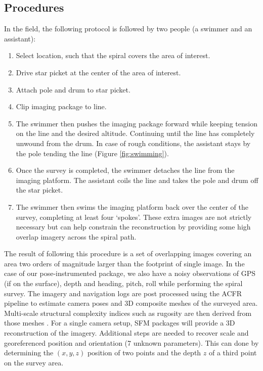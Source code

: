 \subsection{Procedures}

In the field, the following protocol is followed by two people (a swimmer and an assistant):\begin{enumerate}
\item Select location, such that the spiral covers the area of interest.
\item Drive star picket at the center of the area of interest. 
\item Attach pole and drum to star picket.
\item Clip imaging package to line.
\item The swimmer then pushes the imaging package forward while keeping tension on the line and the desired altitude. Continuing until the line has completely unwound from the drum. In case of rough conditions, the assistant stays by the pole tending the line (Figure \ref{fig:swimming}).
\item Once the survey is completed, the swimmer detaches the line from the imaging platform. The assistant coils the line and takes the pole and drum off the star picket. 
\item The swimmer then swims the imaging platform back over the center of the survey, completing at least four `spokes'. These extra images are not strictly necessary but can help constrain the reconstruction by providing some high overlap imagery across the spiral path.
\end{enumerate}

The result of following this procedure is a set of overlapping images covering an area two orders of magnitude larger than the footprint of single image. In the case of our pose-instrumented package, we also have a noisy observations of GPS (if on the surface), depth and heading, pitch, roll while performing the spiral survey. The imagery and navigation logs are post processed using the ACFR pipeline \cite{Johnson_Roberson_2010} \cite{Mahon_2008} \cite{Johnson_Roberson_2013} to estimate camera poses and 3D composite meshes of the surveyed area. Multi-scale structural complexity indices such as rugosity are then derived from those meshes \cite{Friedman_2012}.
For a single camera setup, SFM packages will provide a 3D reconstruction of the imagery. Additional steps are needed to recover scale and georeferenced position and orientation (7 unknown parameters). This can done by determining the $(x,y,z)$ position of two points and the depth $z$ of a third point on the survey area.
